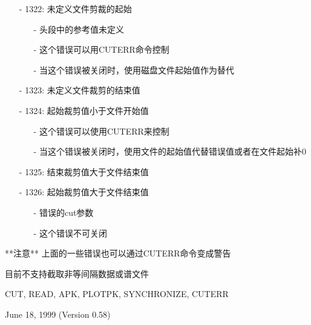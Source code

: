 \begin{itemize}
\item[-]1322: 未定义文件剪裁的起始
	\begin{itemize}
	\item[-]头段中的参考值未定义
	\item[-]这个错误可以用CUTERR命令控制
	\item[-]当这个错误被关闭时，使用磁盘文件起始值作为替代
	\end{itemize}
\item[-]1323: 未定义文件裁剪的结束值
\item[-]1324: 起始裁剪值小于文件开始值
	\begin{itemize}
	\item[-]这个错误可以使用CUTERR来控制
	\item[-]当这个错误被关闭时，使用文件的起始值代替错误值或者在文件起始补0
	\end{itemize}
\item[-]1325: 结束裁剪值大于文件结束值
\item[-]1326: 起始裁剪值大于文件结束值
	\begin{itemize}
	\item[-]错误的cut参数
	\item[-]这个错误不可关闭
	\end{itemize}
\end{itemize}

**注意** 上面的一些错误也可以通过CUTERR命令变成警告

目前不支持截取非等间隔数据或谱文件

CUT, READ, APK, PLOTPK, SYNCHRONIZE, CUTERR

June 18, 1999 (Version 0.58)
